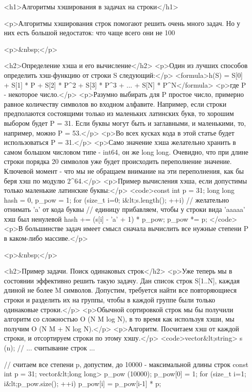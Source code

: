 <h1>Алгоритмы хэширования в задачах на строки</h1>

<p>Алгоритмы хэширования строк помогают решить очень много задач. Но у них есть большой недостаток: что чаще всего они не 100%

<p>&nbsp;</p>

<h2>Определение хэша и его вычисление</h2>
<p>Один из лучших способов определить хэш-функцию от строки S следующий:</p>
<formula>h(S)  =  S[0]  +  S[1] * P  +  S[2] * P^2  +  S[3] * P^3  +  ...  +  S[N] * P^N</formula>
<p>где P - некоторое число.</p>
<p>Разумно выбирать для P простое число, примерно равное количеству символов во входном алфавите. Например, если строки предполаются состоящими только из маленьких латинских букв, то хорошим выбором будет P = 31. Если буквы могут быть и заглавными, и маленькими, то, например, можно P = 53.</p>
<p>Во всех кусках кода в этой статье будет использоваться P = 31.</p>
<p>Само значение хэша желательно хранить в самом большом числовом типе - int64, он же long long. Очевидно, что при длине строки порядка 20 символов уже будет происходить переполнение значение. Ключевой момент - что мы не обращаем внимание на эти переполнения, как бы беря хэш по модулю 2^64.</p>
<p>Пример вычисления хэша, если допустимы только маленькие латинские буквы:</p>
<code>const int p = 31;
long long hash = 0, p_pow = 1;
for (size_t i=0; i&lt;s.length(); ++i)
{
	// желательно отнимать 'a' от кода буквы
	// единицу прибавляем, чтобы у строки вида 'aaaaa' хэш был ненулевой
	hash += (s[i] - 'a' + 1) * p_pow;
	p_pow *= p;
}</code>
<p>В большинстве задач имеет смысл сначала вычислить все нужные степени P в каком-либо массиве.</p>

<p>&nbsp;</p>

<h2>Пример задачи. Поиск одинаковых строк</h2>
<p>Уже теперь мы в состоянии эффективно решить такую задачу. Дан список строк S[1..N], каждая длиной не более M символов. Допустим, требуется найти все повторяющиеся строки и разделить их на группы, чтобы в каждой группе были только одинаковые строки.</p>
<p>Обычной сортировкой строк мы бы получили алгоритм со сложностью O (N M log N), в то время как используя хэши, мы получим O (N M + N log N).</p>
<p>Алгоритм. Посчитаем хэш от каждой строки, и отсортируем строки по этому хэшу.</p>
<code>vector&lt;string> s (n);
// ... считывание строк ...

// считаем все степени p, допустим, до 10000 - максимальной длины строк
const int p = 31;
vector&lt;long long> p_pow (10000);
p_pow[0] = 1;
for (size_t i=1; i&lt;p_pow.size(); ++i)
	p_pow[i] = p_pow[i-1] * p;

